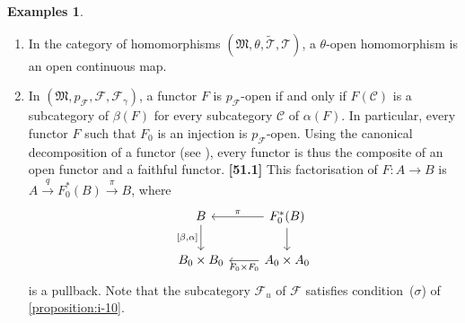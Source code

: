 \documentclass[a4paper,fleqn]{article}
\theoremstyle{plain}
\theoremstyle{definition}
\newtheorem*{examples}{Examples}
\newenvironment{longcomm}[1]
  {\noindent\textbf{[#1]}\rmfamily}
  {}
\newcommand{\CC}{\mathcal{C}}
\newcommand{\MM}{\mathfrak{M}}
\newcommand{\FF}{\mathcal{F}}
\newcommand{\TT}{\mathcal{T}}
\newcommand{\tTT}{\widetilde{\TT}}
\begin{document}
\begin{examples}
  \begin{enumerate}
    \item
      In the category of homomorphisms $(\MM,\theta,\tTT,\TT)$, a $\theta$-open homomorphism is an open continuous map.

    \item
      In $(\MM,p_\FF,\FF,\FF_\gamma)$, a functor $F$ is $p_\FF$-open if and only if $F(\CC)$ is a subcategory of $\beta(F)$ for every subcategory $\CC$ of $\alpha(F)$.
      In particular, every functor $F$ such that $F_0$ is an injection is $p_\FF$-open.
      Using the canonical decomposition of a functor (see \cite{3a}), every functor is thus the composite of an open functor and a faithful functor.
      \begin{longcomm}{51.1}
        This factorisation of $F\colon A\to B$ is $A\xrightarrow{q}F_0^*(B)\xrightarrow{\pi}B$, where
        \[
          \begin{tikzcd}
            B \ar[d,swap,"{[\beta,\alpha]}"]
            & F_0^*(B) \ar[l,swap,"\pi"] \ar[d]
          \\B_0\times B_0
            & A_0\times A_0 \ar[l,"F_0\times F_0"]
          \end{tikzcd}
        \]
        is a pullback.
      \end{longcomm}
      Note that the subcategory $\FF_u$ of $\FF$ satisfies condition~($\sigma$) of \cref{proposition:i-10}.
  \end{enumerate}
\end{examples}
\end{document}
